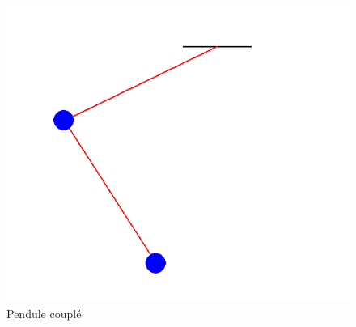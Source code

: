 \documentclass[9pt,a4paper]{article}
\begin{document}
\begin{figure}
  \centering
  \includegraphics[scale=0.9]{Double_pendule.png}
  \caption{Pendule couplé}
  \label{fig:pendule couplé}
\end{figure}
\end{document}
